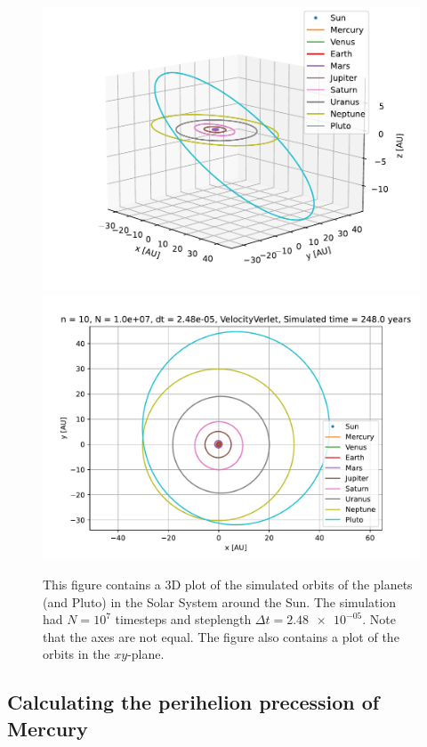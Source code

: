 \documentclass[reprint,english,notitlepage]{revtex4-1}  %
\begin{document}
\begin{figure}[H]
\includegraphics[width=\columnwidth]{../data/figures/sun_and_friends/ss_248_vv_orbits3D.pdf}
\includegraphics[width=\columnwidth]{../data/figures/sun_and_friends/ss_248_vv_orbits2D.pdf}
\caption{This figure contains a 3D plot of the simulated orbits of the planets (and Pluto) in the Solar System around the Sun. The simulation had $N = 10^7$ timesteps and steplength $\Delta t = \num{2.48e-05}$. Note that the axes are not equal. The figure also contains a plot of the orbits in the $xy$-plane.}
\label{fig:ss}
\end{figure}



\subsection{Calculating the perihelion precession of Mercury} \label{sec:IV:g}
\end{document}
